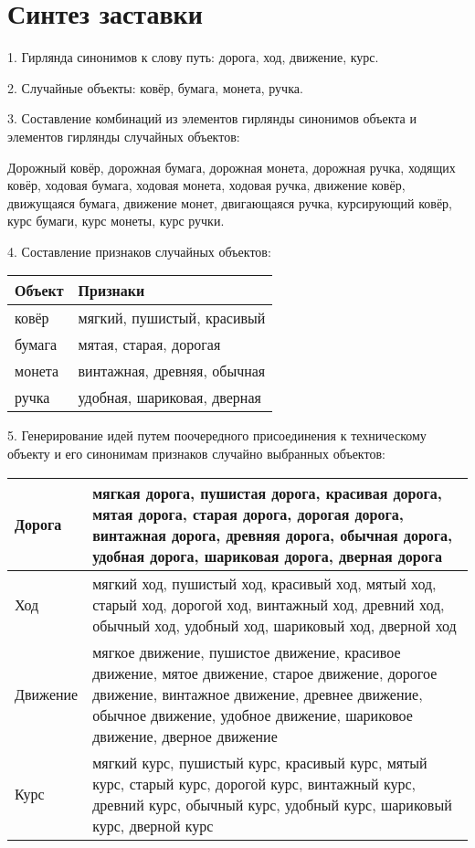 \chapter{Синтез заставки}
1. Гирлянда синонимов к слову путь: дорога, ход, движение, курс.

2. Случайные объекты: ковёр, бумага, монета, ручка.

3. Составление комбинаций из элементов гирлянды синонимов объекта и элементов гирлянды случайных объектов:

Дорожный ковёр, дорожная бумага, дорожная монета, дорожная ручка, ходящих ковёр, ходовая бумага, 
ходовая монета, ходовая ручка, движение ковёр, движущаяся бумага, движение монет, двигающаяся ручка, 
курсирующий ковёр, курс бумаги, курс монеты, курс ручки.

4. Составление признаков случайных объектов:
\begin{table}[h!]
    \center
    \begin{tabularx}{\textwidth}{|X|X|}
        \hline
        Объект & Признаки \\ \hline
        ковёр & мягкий, пушистый, красивый \\ \hline
        бумага & мятая, старая, дорогая \\ \hline
        монета & винтажная, древняя, обычная \\ \hline
        ручка & удобная, шариковая, дверная \\ \hline
    \end{tabularx}
\end{table}

5. Генерирование идей путем поочередного присоединения к техническому объекту и его синонимам 
признаков случайно выбранных объектов:
\begin{table}[h!]
    \center
    \begin{tabularx}{\textwidth}{|X|X|}
        \hline
        Дорога & мягкая дорога, пушистая дорога, красивая дорога, мятая дорога, старая дорога, 
            дорогая дорога, винтажная дорога, древняя дорога, обычная дорога, удобная дорога, 
            шариковая дорога, дверная дорога \\ \hline
        Ход & мягкий ход, пушистый ход, красивый ход, мятый ход, старый ход, дорогой ход, 
            винтажный ход, древний ход, обычный ход, удобный ход, шариковый ход, 
            дверной ход \\ \hline
        Движение & мягкое движение, пушистое движение, красивое движение, мятое движение, 
            старое движение, дорогое движение, винтажное движение, древнее движение, 
            обычное движение, удобное движение, шариковое движение, дверное движение \\ \hline
        Курс & мягкий курс, пушистый курс, красивый курс, мятый курс, старый курс, дорогой курс, 
            винтажный курс, древний курс, обычный курс, удобный курс, шариковый курс, 
            дверной курс \\ \hline
    \end{tabularx}
\end{table}

